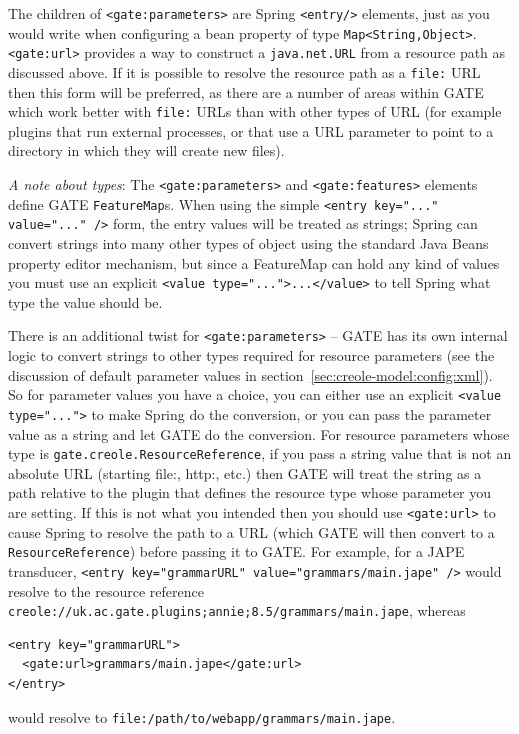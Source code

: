 The children of \verb|<gate:parameters>| are Spring \verb|<entry/>|
elements, just as you would write when configuring a bean property of
type \verb|Map<String,Object>|.  \verb|<gate:url>| provides a way to construct
a \verb|java.net.URL| from a resource path as discussed above.  If it is
possible to resolve the resource path as a \verb|file:| URL then this form will
be preferred, as there are a number of areas within GATE which work better with
\verb|file:| URLs than with other types of URL (for example plugins that run
external processes, or that use a URL parameter to point to a directory in
which they will create new files).

\emph{A note about types}: The \verb|<gate:parameters>| and
\verb|<gate:features>| elements define GATE \verb|FeatureMap|s.  When using the
simple \verb|<entry key="..." value="..." />| form, the entry values will be
treated as strings; Spring can convert strings into many other types of object
using the standard Java Beans property editor mechanism, but since a FeatureMap
can hold any kind of values you must use an explicit
\verb|<value type="...">...</value>| to tell Spring what type the value should
be.

There is an additional twist for \verb|<gate:parameters>| -- GATE has its own
internal logic to convert strings to other types required for resource
parameters (see the discussion of default parameter values in
section~\ref{sec:creole-model:config:xml}).  So for parameter values you have a
choice, you can either use an explicit \verb|<value type="...">| to make Spring
do the conversion, or you can pass the parameter value as a string and let GATE
do the conversion.  For resource parameters whose type is
\verb|gate.creole.ResourceReference|, if you pass a string value that is not an
absolute URL (starting file:, http:, etc.) then GATE will treat the string as a
path relative to the plugin that defines the resource type whose parameter you
are setting.  If this is not what you intended then you should use
\verb|<gate:url>| to cause Spring to resolve the path to a URL (which GATE will
then convert to a \verb!ResourceReference!) before passing it to GATE.  For
example, for a JAPE transducer,
\verb|<entry key="grammarURL" value="grammars/main.jape" />| would resolve to
the resource reference
\verb!creole://uk.ac.gate.plugins;annie;8.5/grammars/main.jape!, whereas
%
\begin{small}\begin{verbatim}
<entry key="grammarURL">
  <gate:url>grammars/main.jape</gate:url>
</entry>
\end{verbatim}\end{small}
would resolve to \verb|file:/path/to/webapp/grammars/main.jape|.

